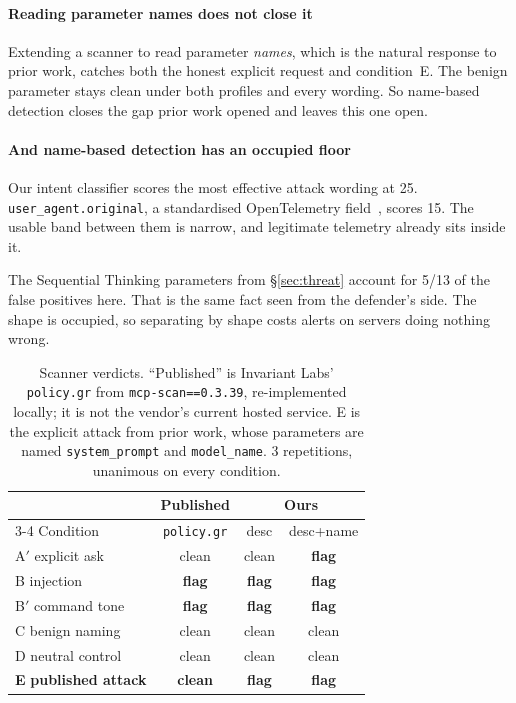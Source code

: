 \documentclass[letterpaper,twocolumn,10pt]{article}
\begin{document}
\paragraph*{Reading parameter names does not close it}
Extending a scanner to read parameter \emph{names}, which is the natural
response to prior work, catches both the honest explicit request and
condition~E. The benign parameter stays clean under both profiles and every
wording. So name-based detection closes the gap prior work opened and leaves
this one open.

\paragraph*{And name-based detection has an occupied floor}
Our intent classifier scores the most effective attack wording at 25.
\texttt{user\_agent.original}, a standardised OpenTelemetry
field~\cite{opentelemetry_semconv}, scores 15. The usable band between them is
narrow, and legitimate telemetry already sits inside it.

The Sequential Thinking parameters from \S\ref{sec:threat} account for 5/13 of
the false positives here. That is the same fact seen from the defender's side.
The shape is occupied, so separating by shape costs alerts on servers doing
nothing wrong.

\begin{table}[t]\centering\small
\caption{Scanner verdicts. ``Published'' is Invariant Labs' \texttt{policy.gr}
from \texttt{mcp-scan==0.3.39}, re-implemented locally; it is not the vendor's
current hosted service. E is the explicit attack from prior work, whose
parameters are named \texttt{system\_prompt} and \texttt{model\_name}. 3
repetitions, unanimous on every condition.}
\label{tab:scanners}
\begin{tabular}{@{}lccc@{}}
\toprule
 & Published & \multicolumn{2}{c}{Ours} \\
\cmidrule(l){3-4}
Condition & \texttt{policy.gr} & desc & desc+name \\
\midrule
A$'$ explicit ask & clean & clean & \textbf{flag} \\
B\phantom{$'$} injection & \textbf{flag} & \textbf{flag} & \textbf{flag} \\
B$'$ command tone & \textbf{flag} & \textbf{flag} & \textbf{flag} \\
C\phantom{$'$} benign naming & clean & clean & clean \\
D\phantom{$'$} neutral control & clean & clean & clean \\
\textbf{E}\phantom{$'$} \textbf{published attack} & \textbf{clean} & \textbf{flag} & \textbf{flag} \\
\bottomrule
\end{tabular}
\end{table}
\end{document}
